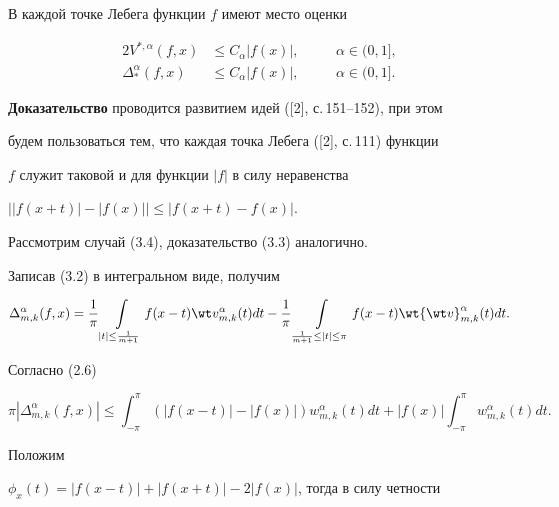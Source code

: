 \begin{thms}


В каждой точке Лебега функции $f$ имеют место оценки


\begin{alignat}{2}


V^{*,\alpha}(f,x)&\le C_{\alpha} |f(x)|,&\quad &\alpha\in(0,1],\\


%


\Delta_*^{\alpha}(f,x)&\le C_{\alpha} |f(x)|,&\quad & \alpha\in(0,1].


\end{alignat}


\end{thms}





{\bf Доказательство} проводится развитием идей ([2], с.\,151--152), при этом


будем пользоваться тем, что каждая точка Лебега ([2], с.\,111) функции


$f$ служит таковой и для функции $|f|$ в силу неравенства


$\big||f(x+t)|-|f(x)|\big|\le |f(x+t)-f(x)|$.





Рассмотрим случай (3.4), доказательство (3.3) аналогично.


Записав (3.2) в интегральном виде, получим


$$


\Delta_{m,k}^{\alpha}(f,x)


=\frac {1}{\pi} \int\limits_{|t|\le \frac {1}{m+1}} f(x-t)


\wt v_{m,k}^{\alpha}(t)dt-


\frac {1}{\pi} \int\limits_{ \frac {1}{m+1}\le |t|\le \pi} f(x-t)


\wt {\wt v}_{m,k}^{\alpha}(t)dt.


$$


Согласно (2.6)


$$


\pi |\Delta_{m,k}^{\alpha}(f,x)|\le


\int_{-\pi}^\pi (|f(x-t)|-|f(x)|)w_{m,k}^\alpha (t)dt +


|f(x)|\int_{-\pi}^\pi w_{m,k}^\alpha (t)dt.


$$


Положим


$\phi_x (t)= |f(x-t)|+|f(x+t)|-2 |f(x)|$, тогда в силу четности


